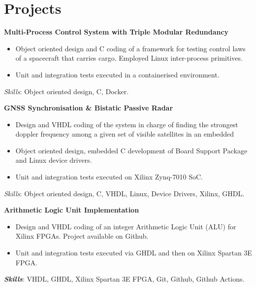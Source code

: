 \documentclass[letterpaper]{twentysecondcv} %
\begin{document}
\newpage
\makeextrainfo %

\section{Projects}

\textbf{Multi-Process Control System with Triple Modular Redundancy}
\vspace{1 mm}
\begin{itemize}
    \item Object oriented design and C coding of a framework for testing control laws of a spacecraft that carries cargo. Employed Linux inter-process primitives.
    \item Unit and integration tests executed in a containerised environment.
\end{itemize}

\textit{Skills}: Object oriented design, C, Docker.

\textbf{GNSS Synchronisation \& Bistatic Passive Radar}

\begin{itemize}
    \item Design and VHDL coding of the system in charge of finding the strongest doppler frequency among a given set of visible satellites in an embedded
    \item Object oriented design, embedded C development of Board Support Package and Linux device drivers.
    \item Unit and integration tests executed on Xilinx Zynq-7010 SoC.
\end{itemize}

\textit{Skills}: Object oriented design, C, VHDL, Linux, Device Drivers, Xilinx, GHDL.

\textbf{Arithmetic Logic Unit Implementation}

\begin{itemize}
    \item Design and VHDL coding of an integer Arithmetic Logic Unit (ALU) for Xilinx FPGAs. Project available on Github.
    \item Unit and integration tests executed via GHDL and then on Xilinx Spartan 3E FPGA.
\end{itemize}

\textbf{\textit{Skills}}: VHDL, GHDL, Xilinx Spartan 3E FPGA, Git, Github, Github Actions.
\end{document}
